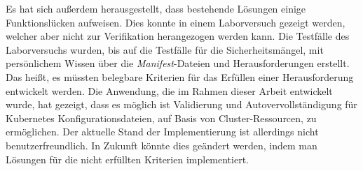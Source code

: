 Es hat sich außerdem herausgestellt, dass bestehende Lösungen einige Funktionslücken aufweisen.
Dies konnte in einem Laborversuch gezeigt werden, welcher aber nicht zur Verifikation herangezogen werden kann.
Die Testfälle des Laborversuchs wurden, bis auf die Testfälle für die Sicherheitsmängel,
mit persönlichem Wissen über die \textit{Manifest}-Dateien und Herausforderungen erstellt.
Das heißt, es müssten belegbare Kriterien für das Erfüllen einer Herausforderung entwickelt werden.
Die Anwendung, die im Rahmen dieser Arbeit entwickelt wurde, hat gezeigt, dass es möglich ist
Validierung und Autovervollständigung für Kubernetes Konfigurationsdateien, auf Basis von Cluster-Ressourcen, zu ermöglichen.
Der aktuelle Stand der Implementierung ist allerdings nicht benutzerfreundlich.
In Zukunft könnte dies geändert werden, indem man Lösungen für die nicht erfüllten Kriterien implementiert.